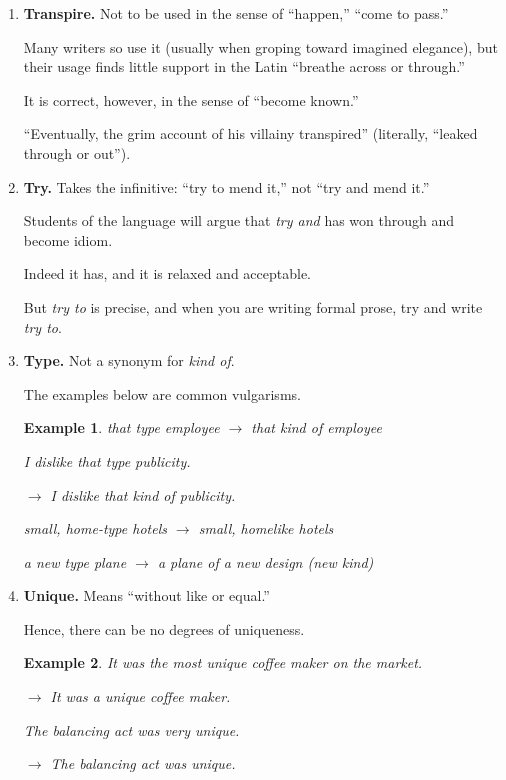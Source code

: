 \documentclass{book}
\numberwithin{equation}{section}
\newtheorem{example}{Example}[chapter]
\begin{document}
\begin{enumerate}
    Both words carry the idea of ``twist,'' the twist having been a form of torture.
    \item \textbf{Transpire.} Not to be used in the sense of ``happen,'' ``come to pass.''
    
    Many writers so use it (usually when groping toward imagined elegance), but their usage finds little support in the Latin ``breathe across or through.''
    
    It is correct, however, in the sense of ``become known.''
    
    ``Eventually, the grim account of his villainy transpired'' (literally, ``leaked through or out'').
    \item \textbf{Try.} Takes the infinitive: ``try to mend it,'' not ``try and mend it.''
    
    Students of the language will argue that \textit{try and} has won through and become idiom.
    
    Indeed it has, and it is relaxed and acceptable.
    
    But \textit{try to} is precise, and when you are writing formal prose, try and write \textit{try to}.
    \item \textbf{Type.} Not a synonym for \textit{kind of}.
    
    The examples below are common vulgarisms.
    \begin{example}
        that type employee $\to$ that kind of employee
        
        I dislike that type publicity.
        
        $\to$ I dislike that kind of publicity.
        
        small, home-type hotels $\to$ small, homelike hotels
        
        a new type plane $\to$ a plane of a new design (new kind)
    \end{example}
    \item \textbf{Unique.} Means ``without like or equal.''
    
    Hence, there can be no degrees of uniqueness.
    \begin{example}
        It was the most unique coffee maker on the market.
        
        $\to$ It was a unique coffee maker.
        
        The balancing act was very unique.
        
        $\to$ The balancing act was unique.
        

\end{example}
\end{enumerate}
\end{document}
